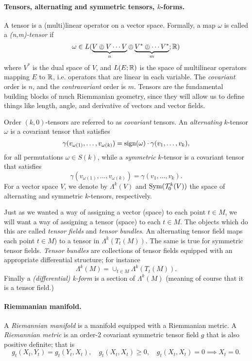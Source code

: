\documentclass{article}
\begin{document}
	\paragraph{Tensors, alternating and symmetric tensors, $k$-forms.}
	A tensor is a (multi)linear operator on a vector space. Formally, a map $\omega$ is called a \emph{(n,m)-tensor} if 
	$$
	\omega \in L(\underbrace{V \oplus V \cdots V}_{n} \oplus \underbrace{V^{*} \oplus \cdots V^*}_{m};\mathbb{R})
	$$ 
	where $V^*$ is the dual space of $V$, and $L(E;\mathbb{R})$ is the space of multilinear operators mapping $E$ to $\mathbb{R}$, i.e. operators that are linear in each variable. The \emph{covariant} order is $n$, and the \emph{contravariant} order is $m$. Tensors are the fundamental building blocks of much Riemmanian geometry, since they will allow us to define things like length, angle, and derivative of vectors and vector fields. 
	
	Order $(k,0)$-tensors are referred to as \emph{covariant} tensors. An \emph{alternating} $k$-tensor $\omega$ is a covariant tensor that satisfies
	\begin{equation*}
		\gamma(v_{\omega(1)},\ldots,v_{\omega(k)}) = \mathrm{sign}(\omega) \cdot \gamma(v_{1},\ldots,v_{k}),
	\end{equation*}
	for all permutations $\omega \in S(k)$, while a \emph{symmetric} $k$-tensor is a covariant tensor that satisfies
	\begin{equation*}
		\gamma(v_{\omega(1)},\ldots,v_{\omega(k)}) = \gamma(v_{1},\ldots,v_{k}).
	\end{equation*}
	For a vector space $V$, we denote by $\Lambda^k(V)$ and ${\rm Sym}(\mathcal{T}_0^{k}(V))$ the space of alternating and symmetric $k$-tensors, respectively. 
	
	Just as we wanted a way of assigning a vector (space) to each point $t \in M$, we will want a way of assigning a tensor (space) to each $t \in M$. The objects which do this are called \emph{tensor fields} and \emph{tensor bundles}. An alternating tensor field maps each point $t \in M$) to a tensor in $\Lambda^{k}(T_t(M))$. The same is true for symmetric tensor fields. \emph{Tensor bundles} are collections of tensor fields equipped with an appropriate differential structure; for instance
	$$
	\Lambda^k(M) = \cup_{t \in M} \Lambda^k(T_t(M)).
	$$
	Finally a \emph{(differential) k-form} is a section of $\Lambda^k(M)$ (meaning of course that it is a tensor field.)
	
	\paragraph{Riemmanian manifold.}
	A \emph{Riemannian manifold} is a manifold equipped with a Riemmanian metric. A \emph{Riemannian metric} is an order-2 covariant symmetric tensor field $g$ that is also positive definite; that is
	$$
	g_t(X_t,Y_t) = g_t(Y_t,X_t), \quad g_t(X_t,X_t) \geq 0, \quad g_t(X_t,X_t) = 0 \implies X_t = 0.
	$$
	
\end{document}
